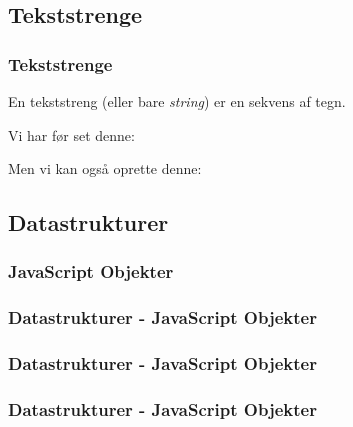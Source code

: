 \subsection{Tekststrenge}
\begin{frame}
    \frametitle{Tekststrenge}
    \vspace{3mm}
    En tekststreng (eller bare \textsl{string}) er en sekvens af tegn.
    
    \vspace{5mm}
    Vi har før set denne:
    \vspace{-1mm}
    \begin{center}
    \end{center}
    
    Men vi kan også oprette denne:
    \vspace{-1mm}
    \begin{center}
    \end{center}
\end{frame}

\subsection{Datastrukturer}
\subsubsection{JavaScript Objekter}

\begin{frame}
    \frametitle{Datastrukturer - JavaScript Objekter}
    \vspace{-1mm}
    \begin{center}
    \end{center}
\end{frame}
\begin{frame}
    \frametitle{Datastrukturer - JavaScript Objekter}
    \vspace{-1mm}
    \begin{center}
    \end{center}
\end{frame}
\begin{frame}
    \frametitle{Datastrukturer - JavaScript Objekter}
    \vspace{-1mm}
    \begin{center}
    \end{center}
\end{frame}

